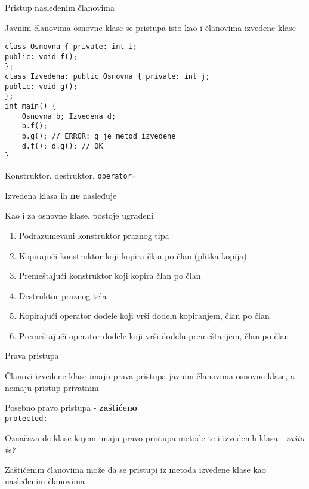\documentclass{article}
\newenvironment{xitemize}{%
    
    \itemize
    \larger
}{%
    \enditemize
}
\let\olditemize\itemize
\let\endolditemize\enditemize
\renewenvironment{itemize}{%
    \smaller
    \olditemize
}{%
    \endolditemize
}
\providecommand{\inlinecode}[1]{\texttt{#1}}
\begin{document}
\begin{xitemize}
\begin{multicols}{2}
\begin{itemize}
\end{itemize}
\item Pristup nasleđenim članovima
\begin{itemize}
    \item Javnim članovima osnovne klase se pristupa isto kao i članovima izvedene klase
\end{itemize}
\columnbreak
\begin{lstlisting}
class Osnovna { private: int i;
public: void f();
};
class Izvedena: public Osnovna { private: int j;
public: void g();
};
int main() {
    Osnovna b; Izvedena d;
    b.f();
    b.g(); // ERROR: g je metod izvedene
    d.f(); d.g(); // OK
}
    \end{lstlisting}
\end{multicols}
\item Konstruktor, destruktor, \inlinecode{operator=}
\begin{itemize}
    \item Izvedena klasa ih \textbf{ne} nasleđuje
    \item Kao i za osnovne klase, postoje ugrađeni
    \begin{enumerate}
        \item Podrazumevani konstruktor praznog tipa
        \item Kopirajući konstruktor koji kopira član po član (plitka kopija)
        \item Premeštajući konstruktor koji kopira član po član
        \item Destruktor praznog tela
        \item Kopirajući operator dodele koji vrši dodelu kopiranjem, član po član
        \item Premeštajući operator dodele koji vrši dodelu premeštanjem, član po član
    \end{enumerate}
\end{itemize}
\item Prava pristupa
\begin{itemize}
    \item Članovi izvedene klase imaju prava pristupa javnim članovima osnovne klase, a nemaju pristup privatnim
    \item  Posebno pravo pristupa - \textbf{zaštićeno}\\
    \inlinecode{protected:}
    \item Označava de klase kojem imaju pravo pristupa metode te i izvedenih klasa - \textit{zašto te?}
    \item Zaštićenim članovima može da se pristupi iz metoda izvedene klase kao nasleđenim članovima

\end{itemize}
\end{xitemize}
\end{document}
